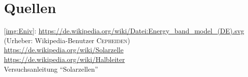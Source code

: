 \documentclass[numbers=noenddot,12pt,a4paper]{scrartcl}
\begin{document}
\section{Quellen}
\ref{img:Eniv}: \url{https://de.wikipedia.org/wiki/Datei:Energy_band_model_(DE).svg} (Urheber: Wikipedia-Benutzer \textsc{Cepheiden})\\
\url{https://de.wikipedia.org/wiki/Solarzelle}\\
\url{https://de.wikipedia.org/wiki/Halbleiter}\\
Versuchsanleitung "`Solarzellen"'
\end{document}
